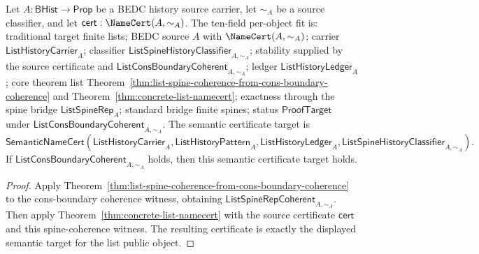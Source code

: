\begin{theorem}
\label{thm:list-public-object-certificate-from-cons-boundary-coherence}
Let $A:\mathsf{BHist}\to\mathsf{Prop}$ be a BEDC history source carrier, let
$\sim_A$ be a source classifier, and let
$\mathsf{cert}:\NameCert(A,\sim_A)$. The ten-field per-object fit is:
traditional target finite lists; BEDC source $A$ with $\NameCert(A,\sim_A)$;
carrier $\mathsf{ListHistoryCarrier}_A$; classifier
$\mathsf{ListSpineHistoryClassifier}_{A,\sim_A}$; stability supplied by the
source certificate and $\mathsf{ListConsBoundaryCoherent}_{A,\sim_A}$; ledger
$\mathsf{ListHistoryLedger}_A$; core theorem list
Theorem~\ref{thm:list-spine-coherence-from-cons-boundary-coherence} and
Theorem~\ref{thm:concrete-list-namecert}; exactness through the spine bridge
$\mathsf{ListSpineRep}_A$; standard bridge finite spines; status
$\mathsf{ProofTarget}$ under
$\mathsf{ListConsBoundaryCoherent}_{A,\sim_A}$. The semantic certificate target
is
$$
\mathsf{SemanticNameCert}(\mathsf{ListHistoryCarrier}_A,
\mathsf{ListHistoryPattern}_A,
\mathsf{ListHistoryLedger}_A,
\mathsf{ListSpineHistoryClassifier}_{A,\sim_A}).
$$
If $\mathsf{ListConsBoundaryCoherent}_{A,\sim_A}$ holds, then this semantic
certificate target holds.
\end{theorem}
\begin{proof}
Apply Theorem~\ref{thm:list-spine-coherence-from-cons-boundary-coherence} to
the cons-boundary coherence witness, obtaining
$\mathsf{ListSpineRepCoherent}_{A,\sim_A}$. Then apply
Theorem~\ref{thm:concrete-list-namecert} with the source certificate
$\mathsf{cert}$ and this spine-coherence witness. The resulting certificate is
exactly the displayed semantic target for the list public object.
\end{proof}

